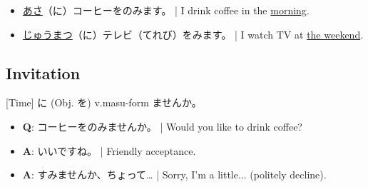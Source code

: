 \documentclass{article}
\begin{document}
\begin{CJK}{UTF8}{min}
\begin{itemize}
\item \underline{あさ}（に）コーヒーをのみます。 | I drink coffee in the \underline{morning}.
\item \underline{じゅうまつ}（に）テレビ（てれび）をみます。 | I watch TV at \underline{the weekend}.
\end{itemize}

\subsection{Invitation}

[Time] に (Obj. を) v.masu-form ませんか。

\begin{itemize}
\item {\bf Q}: コーヒーをのみませんか。 | Would you like to drink coffee?
\item {\bf A}: いいですね。 | Friendly acceptance.
\item {\bf A}: すみませんか、ちょって… | Sorry, I'm a little... (politely decline).
\end{itemize}







\end{CJK}
\end{document}
